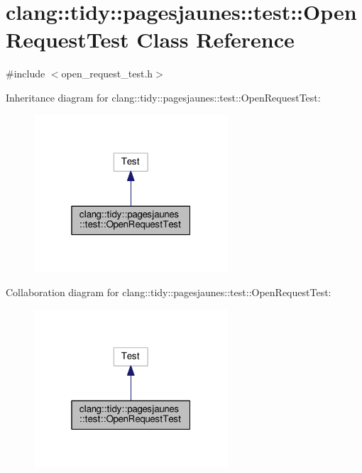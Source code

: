 \hypertarget{classclang_1_1tidy_1_1pagesjaunes_1_1test_1_1_open_request_test}{}\section{clang\+:\+:tidy\+:\+:pagesjaunes\+:\+:test\+:\+:Open\+Request\+Test Class Reference}
\label{classclang_1_1tidy_1_1pagesjaunes_1_1test_1_1_open_request_test}


{\ttfamily \#include $<$open\+\_\+request\+\_\+test.\+h$>$}



Inheritance diagram for clang\+:\+:tidy\+:\+:pagesjaunes\+:\+:test\+:\+:Open\+Request\+Test\+:
\nopagebreak
\begin{figure}[H]
\begin{center}
\leavevmode
\includegraphics[width=205pt]{classclang_1_1tidy_1_1pagesjaunes_1_1test_1_1_open_request_test__inherit__graph}
\end{center}
\end{figure}


Collaboration diagram for clang\+:\+:tidy\+:\+:pagesjaunes\+:\+:test\+:\+:Open\+Request\+Test\+:
\nopagebreak
\begin{figure}[H]
\begin{center}
\leavevmode
\includegraphics[width=205pt]{classclang_1_1tidy_1_1pagesjaunes_1_1test_1_1_open_request_test__coll__graph}
\end{center}
\end{figure}
